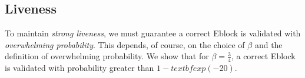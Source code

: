 








\subsection{Liveness} \label{Liveness}
To maintain \emph{strong liveness}, we must guarantee a correct Eblock is validated with \emph{overwhelming probability}. This depends, of course, on the choice of $\beta$ and the definition of overwhelming probability. We show that for $\beta=\frac{3}{4}$, a correct Eblock is validated with probability greater than $1-textbf{exp}(-20)$.

